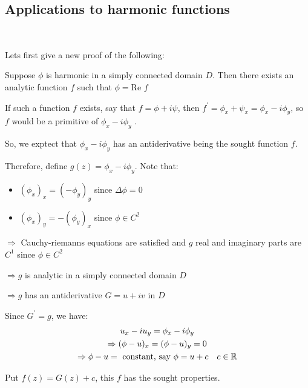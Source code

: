 \subsection{Applications to harmonic functions}\hfill\\\par
\noindent Lets first give a new proof of the following:
\par\bigskip
\begin{theo}[]{}
  Suppose $\phi$  is harmonic in a simply connected domain $D$. Then there exists an analytic function $f$ such that $\phi = \text{Re } f$
\end{theo}
\par\bigskip
\begin{prf}[]{}
  If such a function $f$ exists, say that $f = \phi + i\psi$, then $f^{\prime} = \phi_x + \psi_x = \phi_x-i\phi_y$, so $f$ would be a primitive of $\phi_x-i\phi_y$ .
  \par\bigskip
  \noindent So, we exptect that $\phi_x-i\phi_y$ has an antiderivative being the sought function $f$.
  \par\bigskip
  \noindent Therefore, define $g(z) = \phi_x -i\phi_y$. Note that:\par
  \begin{itemize}
    \item $(\phi_x)_x = (-\phi_y)_y$ since $\Delta\phi = 0$
    \item $(\phi_x)_y = -(\phi_y)_x$ since $\phi\in C^2$
  \end{itemize}
  \par\bigskip
  \noindent $\Rightarrow$ Cauchy-riemanns equations are satisfied and $g$ real and imaginary parts are $C^1$ since $\phi\in C^2$\par
  \noindent $\Rightarrow g$ is analytic in a simply connected domain $D$\par
  \noindent $\Rightarrow g$ has an antiderivative $G = u+iv$ in $D$
  \par\bigskip
  \noindent Since $G^{\prime} = g$, we have:
  \begin{equation*}
    \begin{gathered}
      u_x -iu_y = \phi_x -i\phi_y\\
      \Rightarrow (\phi-u)_x = (\phi-u)_y = 0\\
      \Rightarrow \phi-u = \text{ constant, say } \phi = u+c\quad c\in\mathbb{R}
    \end{gathered}
  \end{equation*}\par
  \noindent Put $f(z) = G(z)+c$, this $f$ has the sought properties. 
\end{prf}
